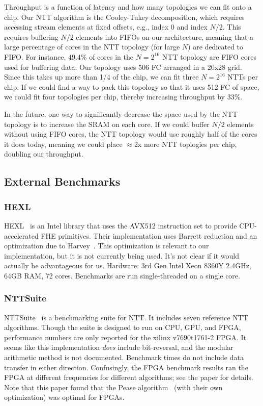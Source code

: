 \documentclass{article}
\begin{document}
	Throughput is a function of latency and how many topologies we can fit onto a chip. Our NTT algorithm is the Cooley-Tukey decomposition, which requires accessing stream elements at fixed offsets, e.g., index 0 and index $N/2$. This requires buffering $N/2$ elements into FIFOs on our architecture, meaning that a large percentage of cores in the NTT topology (for large $N$) are dedicated to FIFO. For instance, $49.4\%$ of cores in the $N=2^{16}$ NTT topology are FIFO cores used for buffering data. Our topology uses 506 FC arranged in a 20x28 grid. Since this takes up more than 1/4 of the chip, we can fit three $N=2^{16}$ NTTs per chip. If we could find a way to pack this topology so that it uses 512 FC of space, we could fit four topologies per chip, thereby increasing throughput by 33\%.
	
	In the future, one way to significantly decrease the space used by the NTT topology is to increase the SRAM on each core. If we could buffer $N/2$ elements without using FIFO cores, the NTT topology would use roughly half of the cores it does today, meaning we could place $\approx$2x more NTT toplogies per chip, doubling our throughput.
	
	\subsection{External Benchmarks}
	
	\subsubsection{HEXL}
	HEXL~\cite{cryptoeprint:2021/420} is an Intel library that uses the AVX512 instruction set to provide CPU-accelerated FHE primitives. Their implementation uses Barrett reduction and an optimization due to Harvey~\cite{Harvey_2014}. This optimization is relevant to our implementation, but it is not currently being used. It's not clear if it would actually be advantageous for us.
	Hardware: 3rd Gen Intel Xeon 8360Y 2.4GHz, 64GB RAM, 72 cores. Benchmarks are run single-threaded on a single core.
	
	\subsubsection{NTTSuite}
	NTTSuite~\cite{ding2024nttsuitenumbertheoretictransform} is a benchmarking suite for NTT. It includes seven reference NTT algorithms. Though the suite is designed to run on CPU, GPU, and FPGA, performance numbers are only reported for the xilinx v7690t1761-2 FPGA. It seems like this implementation \emph{does} include bit-reversal, and the modular arithmetic method is not documented. Benchmark times do not include data transfer in either direction. Confusingly, the FPGA benchmark results ran the FPGA at different frequencies for different algorithms; see the paper for details. Note that this paper found that the Pease algorithm~\cite{10.1145/321450.321457} (with their own optimization) was optimal for FPGAs.
	
\end{document}
